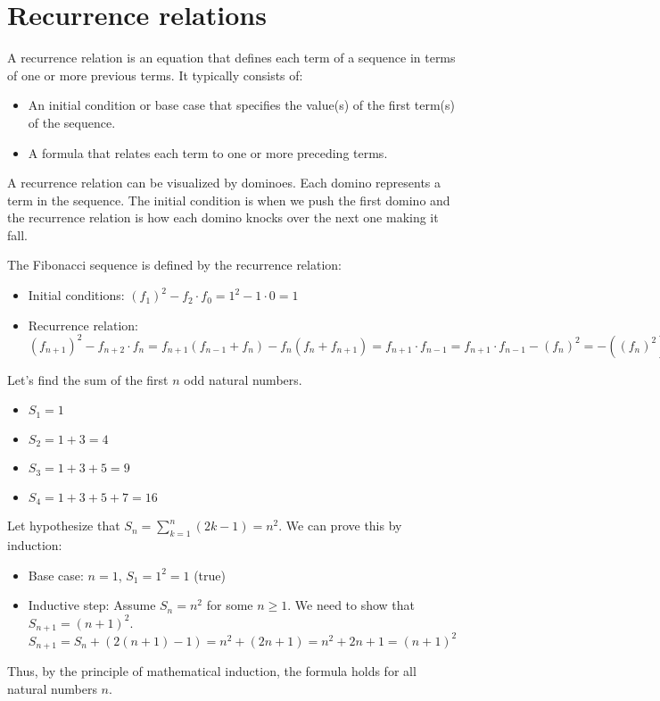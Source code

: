 \section{Recurrence relations}
\begin{definition}
    A recurrence relation is an equation that defines each term of a sequence in terms of one or more previous terms. It typically consists of:
    \begin{itemize}[itemsep=1pt,label=$\circ$]
        \item An initial condition or base case that specifies the value(s) of the first term(s) of the sequence.
        \item A formula that relates each term to one or more preceding terms.
    \end{itemize}
\end{definition}
A recurrence relation can be visualized by dominoes. Each domino represents a term in the sequence. The initial condition is when we push the first domino and the recurrence relation is how each domino knocks over the next one making it fall.
\begin{eg}
    The Fibonacci sequence is defined by the recurrence relation:
    \begin{itemize}[itemsep=1pt,label=$\circ$]
        \item Initial conditions: $(f_1)^2 - f_2 \cdot f_0 = 1^2 - 1 \cdot 0 = 1$
        \item Recurrence relation: $(f_{n + 1})^2 - f_{n + 2} \cdot f_n = f_{n+1}(f_{n -1} + f_n) - f_n (f_n + f_{n + 1}) = f_{n + 1} \cdot f_{n -1} = f_{n + 1} \cdot f_{n - 1} - (f_n)^2 = -((f_n)^2)$
    \end{itemize}
\end{eg}

\begin{eg}
    Let's find the sum of the first $n$ odd natural numbers.
    \begin{itemize}[itemsep=1pt,label=$\circ$]
        \item $S_1 = 1$
        \item $S_2 = 1 + 3 = 4$
        \item $S_3 = 1 + 3 + 5 = 9$
        \item $S_4 = 1 + 3 + 5 + 7 = 16$
    \end{itemize}
    Let hypothesize that $S_n = \sum_{k = 1}^{n} (2k -1) = n^2$. We can prove this by induction:
    \begin{itemize}[itemsep=1pt,label=$\circ$]
        \item Base case: $n = 1$, $S_1 = 1^2 = 1$ (true)
        \item Inductive step: Assume $S_n = n^2$ for some $n \geq 1$. We need to show that $S_{n + 1} = (n + 1)^2$.
        \[
        S_{n + 1} = S_n + (2(n + 1) - 1) = n^2 + (2n + 1) = n^2 + 2n + 1 = (n + 1)^2
        \]
    \end{itemize}
    Thus, by the principle of mathematical induction, the formula holds for all natural numbers \( n \).
\end{eg}

